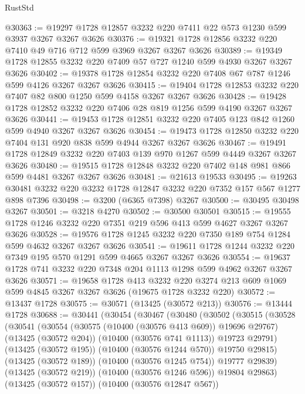 \begin{lexlean}{RustStd}
\begin{coremodule}
@30363 := @19297 @1728 @12857 @3232 @220 @7411 @22 @573 @1230 @599 @3937 @3267 @3267 @3626
@30376 := @19321 @1728 @12856 @3232 @220 @7410 @49 @716 @712 @599 @3969 @3267 @3267 @3626
@30389 := @19349 @1728 @12855 @3232 @220 @7409 @57 @727 @1240 @599 @4930 @3267 @3267 @3626
@30402 := @19378 @1728 @12854 @3232 @220 @7408 @67 @787 @1246 @599 @4126 @3267 @3267 @3626
@30415 := @19404 @1728 @12853 @3232 @220 @7407 @82 @800 @1250 @599 @4158 @3267 @3267 @3626
@30428 := @19428 @1728 @12852 @3232 @220 @7406 @28 @819 @1256 @599 @4190 @3267 @3267 @3626
@30441 := @19453 @1728 @12851 @3232 @220 @7405 @123 @842 @1260 @599 @4940 @3267 @3267 @3626
@30454 := @19473 @1728 @12850 @3232 @220 @7404 @131 @920 @838 @599 @4944 @3267 @3267 @3626
@30467 := @19491 @1728 @12849 @3232 @220 @7403 @139 @970 @1267 @599 @4449 @3267 @3267 @3626
@30480 := @19515 @1728 @12848 @3232 @220 @7402 @148 @981 @866 @599 @4481 @3267 @3267 @3626
@30481 := @21613 @19533
@30495 := @19263 @30481 @3232 @220 @3232 @1728 @12847 @3232 @220 @7352 @157 @567 @1277 @898 @7396
@30498 := @3200 (@6365 @7398) @3267
@30500 := @30495 @30498 @3267
@30501 := @3218 @4270
@30502 := @30500 @30501
@30515 := @19555 @1728 @1246 @3232 @220 @7351 @219 @596 @413 @599 @4627 @3267 @3267 @3626
@30528 := @19576 @1728 @1245 @3232 @220 @7350 @189 @754 @1284 @599 @4632 @3267 @3267 @3626
@30541 := @19611 @1728 @1244 @3232 @220 @7349 @195 @570 @1291 @599 @4665 @3267 @3267 @3626
@30554 := @19637 @1728 @741 @3232 @220 @7348 @204 @1113 @1298 @599 @4962 @3267 @3267 @3626
@30571 := @19658
    @1728
    @413
    @3232
    @220
    @3274
    @213
    @609
    @1069
    @599
    @4845
    @3267
    @3267
    @3626
    (@19675 @1728 @3232 @220)
@30572 := @13437 @1728
@30575 := @30571 (@13425 (@30572 @213))
@30576 := @13444 @1728
@30688 := @30441
    (@30454
      (@30467
        (@30480
          (@30502
            (@30515
              (@30528
                (@30541
                  (@30554
                    (@30575 (@10400 (@30576 @413 @609)) @19696 @29767)
                    (@13425 (@30572 @204))
                    (@10400 (@30576 @741 @1113))
                    @19723
                    @29791)
                  (@13425 (@30572 @195))
                  (@10400 (@30576 @1244 @570))
                  @19750
                  @29815)
                (@13425 (@30572 @189))
                (@10400 (@30576 @1245 @754))
                @19777
                @29839)
              (@13425 (@30572 @219))
              (@10400 (@30576 @1246 @596))
              @19804
              @29863)
            (@13425 (@30572 @157))
            (@10400 (@30576 @12847 @567))

\end{coremodule}
\end{lexlean}
